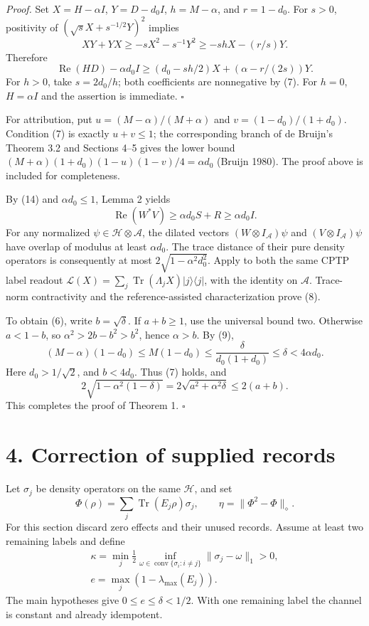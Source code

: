 \documentclass[
  11pt,
  a4paper,
]{article}
\begin{document}
\emph{Proof.} Set \(X=H-\alpha I\), \(Y=D-d_0I\), \(h=M-\alpha\), and
\(r=1-d_0\). For \(s>0\), positivity of \((\sqrt{s}X+s^{-1/2}Y)^2\)
implies \[XY+YX\ge-sX^2-s^{-1}Y^2\ge-shX-(r/s)Y.\] Therefore
\[\operatorname{Re}(HD)-\alpha d_0I
\ge(d_0-sh/2)X+(\alpha-r/(2s))Y.\] For \(h>0\), take \(s=2d_0/h\); both
coefficients are nonnegative by (7). For \(h=0\), \(H=\alpha I\) and the
assertion is immediate. \(\square\)

For attribution, put \(u=(M-\alpha)/(M+\alpha)\) and
\(v=(1-d_0)/(1+d_0)\). Condition (7) is exactly \(u+v\le1\); the
corresponding branch of de Bruijn's Theorem 3.2 and Sections 4--5 gives
the lower bound \((M+\alpha)(1+d_0)(1-u)(1-v)/4=\alpha d_0\) (Bruijn
1980). The proof above is included for completeness.

By (14) and \(\alpha d_0\le1\), Lemma 2 yields
\[\operatorname{Re}(W^*V)\ge\alpha d_0S+R\ge\alpha d_0I.\] For any
normalized \(\psi\in\mathcal H\otimes\mathcal A\), the dilated vectors
\((W\otimes I_{\mathcal A})\psi\) and \((V\otimes I_{\mathcal A})\psi\)
have overlap of modulus at least \(\alpha d_0\). The trace distance of
their pure density operators is consequently at most
\(2\sqrt{1-\alpha^2d_0^2}\). Apply to both the same CPTP label readout
\(\mathcal L(X)=\sum_j\operatorname{Tr}(\Lambda_jX)|j\rangle\langle j|\),
with the identity on \(\mathcal A\). Trace-norm contractivity and the
reference-assisted characterization prove (8).

To obtain (6), write \(b=\sqrt\delta\). If \(a+b\ge1\), use the
universal bound two. Otherwise \(a<1-b\), so \(\alpha^2>2b-b^2>b^2\),
hence \(\alpha>b\). By (9), \[(M-\alpha)(1-d_0)\le M(1-d_0)
\le\frac{\delta}{d_0(1+d_0)}
\le\delta<4\alpha d_0.\] Here \(d_0>1/\sqrt2\), and \(b<4d_0\). Thus (7)
holds, and \[2\sqrt{1-\alpha^2(1-\delta)}
=2\sqrt{a^2+\alpha^2\delta}
\le2(a+b).\] This completes the proof of Theorem 1. \(\square\)

\section{4. Correction of supplied
records}\label{correction-of-supplied-records}

Let \(\sigma_j\) be density operators on the same \(\mathcal H\), and
set \[\Phi(\rho)=\sum_j\operatorname{Tr}(E_j\rho)\sigma_j,\qquad
\eta=\|\Phi^2-\Phi\|_\diamond.\] For this section discard zero effects
and their unused records. Assume at least two remaining labels and
define \[\begin{gathered}
\kappa=\min_j\frac12\inf_{\omega\in\operatorname{conv}\{\sigma_i:i\ne j\}}
\|\sigma_j-\omega\|_1>0,\\
e=\max_j(1-\lambda_{\max}(E_j)).
\end{gathered}
\tag{15}\] The main hypotheses give \(0\le e\le\delta<1/2\). With one
remaining label the channel is constant and already idempotent.
\end{document}
